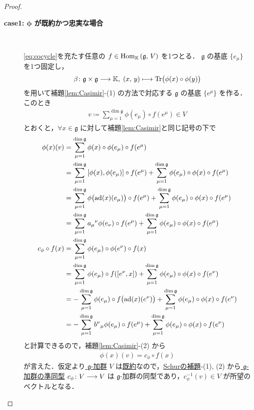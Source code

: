 \documentclass[rep_main]{subfiles}
\begin{document}
\begin{proof}
	\begin{description}
		\item[\textbf{case1: $\bm{\phi}$ が既約かつ忠実な場合}]　
		
		\eqref{eq:cocycle}を充たす任意の $f \in \mathrm{Hom}_{\mathbb{K}} \mathop{}(\mathfrak{g},\, V)$ を1つとる．
		$\mathfrak{g}$ の基底 $\{e_\mu\}$ を1つ固定し，
		\begin{align}
			\beta \colon \mathfrak{g} \times \mathfrak{g} \longrightarrow \mathbb{K},\; (x,\, y) \longmapsto \Tr \bigl( \phi(x) \circ \phi(y) \bigr) 
		\end{align}
		を用いて補題\ref{lem:Casimir}-(1) の方法で対応する $\mathfrak{g}$ の基底 $\{e^\mu\}$ を作る．このとき
		\begin{align}
			v \coloneqq \sum_{\mu = 1}^{\dim \mathfrak{g}} \phi(e_\mu) \circ f(e^\mu) \in V
		\end{align}
		とおくと，$\forall x \in \mathfrak{g}$ に対して補題\ref{lem:Casimir}と同じ記号の下で
		\begin{align}
			\phi(x)(v) 
			&= \sum_{\mu = 1}^{\dim \mathfrak{g}} \phi(x) \circ \phi(e_\mu) \circ f(e^\mu) \\
			&= \sum_{\mu = 1}^{\dim \mathfrak{g}} \comm{\phi(x)}{\phi(e_\mu)} \circ f(e^\mu)  + \sum_{\mu = 1}^{\dim \mathfrak{g}} \phi(e_\mu) \circ \phi(x) \circ f(e^\mu) \\
			&= \sum_{\mu = 1}^{\dim \mathfrak{g}} \phi\bigl(\ad(x)(e_\mu)\bigr) \circ f(e^\mu) + \sum_{\mu = 1}^{\dim \mathfrak{g}} \phi(e_\mu) \circ \phi(x) \circ f(e^\mu) \\
			&= \sum_{\mu = 1}^{\dim \mathfrak{g}} a_\mu{}^\nu \phi(e_\nu) \circ f(e^\mu) + \sum_{\mu = 1}^{\dim \mathfrak{g}} \phi(e_\mu) \circ \phi(x) \circ f(e^\mu) \\
			c_\phi \circ f (x)
			&= \sum_{\mu=1}^{\dim \mathfrak{g}} \phi(e_\mu) \circ \phi(e^\nu) \circ f(x) \\
			&= \sum_{\mu=1}^{\dim \mathfrak{g}} \phi(e_\mu) \circ f(\comm{e^\nu}{x}) 
			+ \sum_{\mu=1}^{\dim \mathfrak{g}} \phi(e_\mu) \circ \phi(x) \circ f(e^\nu) \\
			&= -\sum_{\mu=1}^{\dim \mathfrak{g}} \phi(e_\mu) \circ f \bigl( \ad(x)(e^\nu) \bigr)  
			+ \sum_{\mu=1}^{\dim \mathfrak{g}} \phi(e_\mu) \circ \phi(x) \circ f(e^\nu) \\
			&= -\sum_{\mu=1}^{\dim \mathfrak{g}} b^\nu{}_\mu \phi(e_\mu) \circ f (e^\mu)
			+ \sum_{\mu=1}^{\dim \mathfrak{g}} \phi(e_\mu) \circ \phi(x) \circ f(e^\nu) 
		\end{align}
		と計算できるので，補題\ref{lem:Casimir}-(2) から
		\begin{align}
			\phi(x) (v) = c_\phi \circ f(x)
		\end{align}
		が言えた．仮定より\hyperref[ax:g-module]{ $\mathfrak{g}$-加群} $V$ は\hyperref[def:irr]{既約}なので，\hyperref[lem:Schur]{Schurの補題}-(1), (2) から\hyperref[def:g-module-hom]{ $\mathfrak{g}$-加群の準同型} $c_\phi \colon V \longrightarrow V$ は $\mathfrak{g}$-加群の同型であり，$c_\phi^{-1} (v) \in V$ が所望のベクトルとなる．


\end{description}
\end{proof}
\end{document}
